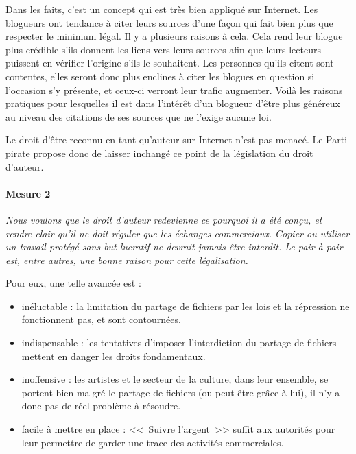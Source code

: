 Dans les faits, c'est un concept qui est très bien appliqué sur Internet.
Les blogueurs ont tendance à citer leurs sources d'une façon qui fait bien plus que respecter le minimum légal.
Il y a plusieurs raisons à cela.
Cela rend leur blogue plus crédible s'ils donnent les liens vers leurs sources afin que leurs lecteurs puissent en vérifier l'origine s'ils le souhaitent.
Les personnes qu'ils citent sont contentes, elles seront donc plus enclines à citer les blogues en question si l'occasion s'y présente, et ceux-ci verront leur trafic augmenter.
Voilà les raisons pratiques pour lesquelles il est dans l'intérêt d'un blogueur d'être plus généreux au niveau des citations de ses sources que ne l'exige aucune loi.

Le droit d'être reconnu en tant qu'auteur sur Internet n'est pas menacé.
Le Parti pirate propose donc de laisser inchangé ce point de la législation du droit d'auteur.

\paragraph{Mesure 2}
\textit{Nous voulons que le droit d'auteur redevienne ce pourquoi il a été conçu, et rendre clair qu'il ne doit réguler que les échanges commerciaux. Copier ou utiliser un travail protégé sans but lucratif ne devrait jamais être interdit.
Le pair à pair est, entre autres, une bonne raison pour cette légalisation.}

Pour eux, une telle avancée est :

\begin{itemize}
\item inéluctable : la limitation du partage de fichiers par les lois et la répression ne fonctionnent pas, et sont contournées.
\item indispensable : les tentatives d'imposer l'interdiction du partage de fichiers mettent en danger les droits fondamentaux.
\item inoffensive : les artistes et le secteur de la culture, dans leur ensemble, se portent bien malgré le partage de fichiers (ou peut être grâce à lui), il n'y a donc pas de réel problème à résoudre.
\item facile à mettre en place : <<~Suivre l'argent~>> suffit aux autorités pour leur permettre de garder une trace des activités commerciales.
\end{itemize}

